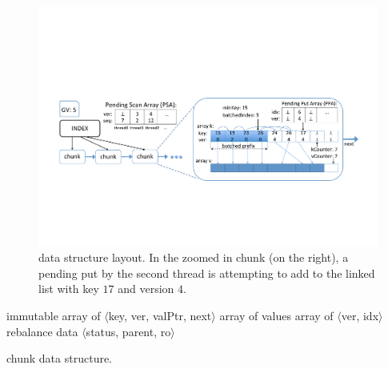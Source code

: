 \begin{figure}[t]
  \centering
  \includegraphics[width=\linewidth]{kiwi-layout4.pdf}
  \caption{{{\kiwi} data structure layout. In the zoomed in chunk (on the right), a pending put by the second
thread is attempting to add  to the linked list with key $17$ and version $4$.}}
  \label{fig:overview-new}
\end{figure}

\begin{algorithm}[t]
\begin{center}
\begin{algorithmic}
	\State immutable   
	\State array  of $\langle$key, ver, valPtr, next$\rangle$    
	\State array  of values									
	\State {}  %
	\State {} 
	\State array  of $\langle$ver, idx$\rangle$ 
	\State {} 
	\State {} 
	\State rebalance data $\langle$status, parent, ro$\rangle$ 
\end{algorithmic}
\end{center}
\caption{{\kiwi} chunk data structure.}
\label{alg:chunk}
\end{algorithm}


